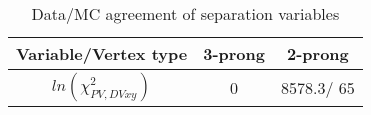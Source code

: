 \documentclass{article}
\begin{document}
\begin{table}[htbp]
\caption{\label{tab:sepVars}Data/MC agreement of separation variables}
\begin{center}
\begin{tabular}{c|c|c}
Variable/Vertex type & 3-prong & 2-prong\\
\hline
$ln ( \chi^{2}_{PV,DV xy} )$ & 0 & 8578.3/ 65\\
\hline
\end{tabular}
\end{center}
\end{table}
\end{document}
